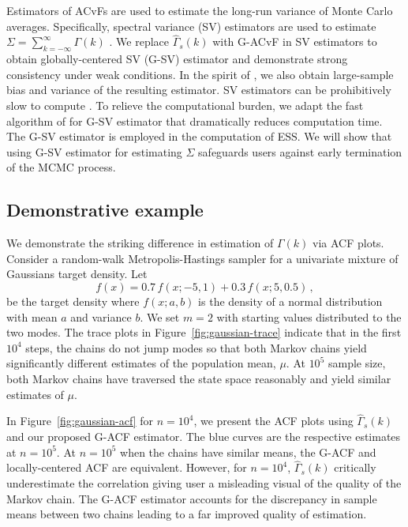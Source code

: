 \documentclass[11pt]{article}
\theoremstyle{remark}
\newtheorem{example}{Example}
\begin{document}
Estimators of ACvFs are used to estimate the long-run variance of Monte Carlo averages. Specifically, spectral variance (SV) estimators  are used to estimate $\Sigma = \sum_{k=-\infty}^{\infty} \Gamma(k)$ \citep{andr:1991,dame:1991,fleg:jone:2010}. We replace $\hat{\Gamma}_s(k)$ with G-ACvF in SV estimators to obtain globally-centered SV (G-SV) estimator and demonstrate strong consistency under weak conditions. In the spirit of \cite{andr:1991}, we also obtain large-sample bias and variance of the resulting estimator. SV estimators can be prohibitively slow to  compute \citep{liu:fleg:2018}. To relieve the computational burden, we adapt the fast algorithm of \cite{heberle2017fast} for G-SV estimator that dramatically reduces computation time. The G-SV estimator  is employed in the computation of ESS. We will show that using G-SV estimator for estimating $\Sigma$ safeguards users against early termination of the MCMC process.

\subsection{Demonstrative example} %
\label{sub:demonstrative_example}


We demonstrate the striking difference in estimation of $\Gamma(k)$ via ACF plots. Consider a random-walk Metropolis-Hastings sampler for a univariate mixture of Gaussians target density. Let
\[
f(x) = 0.7\,f(x; -5, 1) + 0.3\,f(x; 5, 0.5)\,,
\]
be the target density where $f(x; a,b)$ is the density of a normal distribution with mean $a$ and variance $b$. 
We set $m = 2$ with starting values distributed to the two modes. The trace plots in Figure~\ref{fig:gaussian-trace} indicate that in the first $10^4$ steps, the chains do not jump modes so that both Markov chains yield significantly different estimates of the population mean, $\mu$. At $10^5$ sample size, both Markov chains have traversed the state space reasonably and yield similar estimates of $\mu$. 

In Figure~\ref{fig:gaussian-acf} for $n = 10^4$, we present the ACF plots using $\hat{\Gamma}_s(k)$ and our proposed G-ACF estimator. The blue curves are the respective estimates at $n = 10^5$. At $n = 10^5$ when the chains have similar means, the G-ACF and locally-centered ACF are equivalent.  However, for $n = 10^4$, $\hat{\Gamma}_s(k)$ critically underestimate the correlation giving user a misleading visual of the quality of the Markov chain. 
The G-ACF estimator accounts for the discrepancy in sample means between two chains leading to a far improved quality of estimation.
\end{document}
